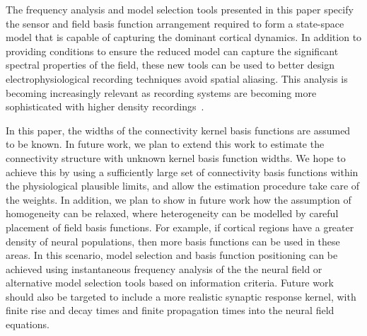 \documentclass[10pt,a4paper]{article}
\begin{document}
The frequency analysis and model selection tools presented in this paper specify the sensor and field basis function arrangement required to form a state-space model that is capable of capturing the dominant cortical dynamics. In addition to providing conditions to ensure the reduced model can capture the significant spectral properties of the field, these new tools can be used to better design electrophysiological recording techniques avoid spatial aliasing. This analysis is becoming increasingly relevant as recording systems are becoming more sophisticated with higher density recordings~\cite{Brinkmann2009}. 

In this paper, the widths of the connectivity kernel basis functions are assumed to be known. In future work, we plan to extend this work to estimate the connectivity structure with unknown kernel basis function widths. We hope to achieve this by using a sufficiently large set of connectivity basis functions within the physiological plausible limits, and allow the estimation procedure take care of the weights. In addition, we plan to show in future work how the assumption of homogeneity can be relaxed, where heterogeneity can be modelled by careful placement of field basis functions. For example, if cortical regions have a greater density of neural populations, then more basis functions can be used in these areas. In this scenario, model selection and basis function positioning can be achieved using instantaneous frequency analysis of the the neural field or alternative model selection tools based on information criteria. Future work should also be targeted to include a more realistic synaptic response kernel, with finite rise and decay times and finite propagation times into the neural field equations.

\appendix 
\end{document}
